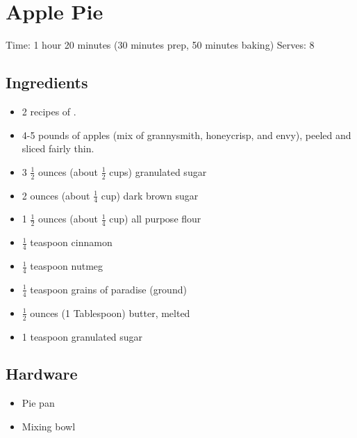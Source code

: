 \section{Apple Pie}
\label{applePie}
\setcounter{secnumdepth}{0}
Time: 1 hour 20 minutes (30 minutes prep, 50 minutes baking)
Serves: 8

\begin{multicols}{2}
\subsection*{Ingredients}
\begin{itemize}
    \item 2 recipes of .
    \item 4-5 pounds of apples (mix of grannysmith, honeycrisp, and envy), peeled and sliced fairly thin.
    \item 3 \( \frac{1}{2} \) ounces (about \( \frac{1}{2} \) cups) granulated sugar
    \item 2 ounces (about \( \frac{1}{4} \) cup) dark brown sugar
    \item 1 \( \frac{1}{2} \) ounces (about \( \frac{1}{4} \) cup) all purpose flour
    \item \( \frac{1}{4} \) teaspoon cinnamon
    \item \( \frac{1}{4} \) teaspoon nutmeg
    \item \( \frac{1}{4} \) teaspoon grains of paradise (ground)
    \item \( \frac{1}{2} \) ounces (1 Tablespoon) butter, melted
    \item 1 teaspoon granulated sugar
\end{itemize}

\subsection*{Hardware}
\begin{itemize}
    \item Pie pan
    \item Mixing bowl
\end{itemize}
\clearpage


\end{multicols}
